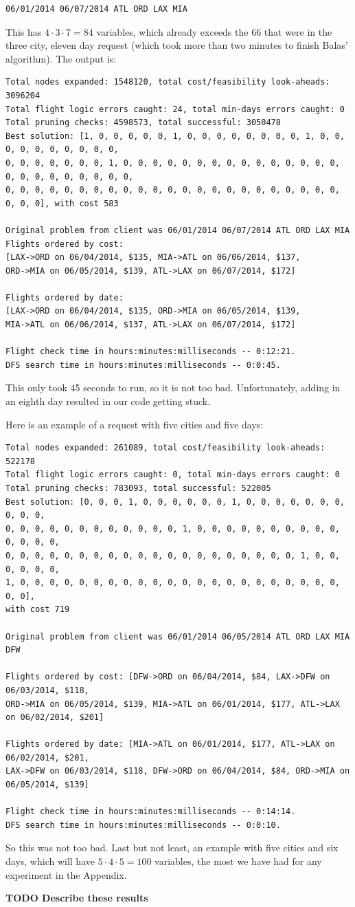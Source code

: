 \documentclass{article}
\begin{document}
\begin{verbatim}
06/01/2014 06/07/2014 ATL ORD LAX MIA
\end{verbatim}

This has $4 \cdot 3 \cdot 7 = 84$ variables, which already exceeds the 66 that were in the three city, eleven day request (which took more than two
minutes to finish Balas' algorithm). The output is:

\scriptsize
\begin{verbatim}
Total nodes expanded: 1548120, total cost/feasibility look-aheads: 3096204
Total flight logic errors caught: 24, total min-days errors caught: 0
Total pruning checks: 4598573, total successful: 3050478
Best solution: [1, 0, 0, 0, 0, 0, 1, 0, 0, 0, 0, 0, 0, 0, 0, 1, 0, 0, 0, 0, 0, 0, 0, 0, 0, 0,
0, 0, 0, 0, 0, 0, 0, 1, 0, 0, 0, 0, 0, 0, 0, 0, 0, 0, 0, 0, 0, 0, 0, 0, 0, 0, 0, 0, 0, 0, 0, 0,
0, 0, 0, 0, 0, 0, 0, 0, 0, 0, 0, 0, 0, 0, 0, 0, 0, 0, 0, 0, 0, 0, 0, 0, 0, 0], with cost 583

Original problem from client was 06/01/2014 06/07/2014 ATL ORD LAX MIA
Flights ordered by cost:
[LAX->ORD on 06/04/2014, $135, MIA->ATL on 06/06/2014, $137,
ORD->MIA on 06/05/2014, $139, ATL->LAX on 06/07/2014, $172]

Flights ordered by date:
[LAX->ORD on 06/04/2014, $135, ORD->MIA on 06/05/2014, $139,
MIA->ATL on 06/06/2014, $137, ATL->LAX on 06/07/2014, $172]

Flight check time in hours:minutes:milliseconds -- 0:12:21.
DFS search time in hours:minutes:milliseconds -- 0:0:45.
\end{verbatim}
\normalsize

This only took 45 seconds to run, so it is not too bad. Unfortunately, adding in an eighth day resulted in our code getting stuck.

Here is an example of a request with five cities and five days:


\scriptsize
\begin{verbatim}
Total nodes expanded: 261089, total cost/feasibility look-aheads: 522178
Total flight logic errors caught: 0, total min-days errors caught: 0
Total pruning checks: 783093, total successful: 522005
Best solution: [0, 0, 0, 1, 0, 0, 0, 0, 0, 0, 1, 0, 0, 0, 0, 0, 0, 0, 0, 0, 0,
0, 0, 0, 0, 0, 0, 0, 0, 0, 0, 0, 0, 1, 0, 0, 0, 0, 0, 0, 0, 0, 0, 0, 0, 0, 0, 0,
0, 0, 0, 0, 0, 0, 0, 0, 0, 0, 0, 0, 0, 0, 0, 0, 0, 0, 0, 0, 1, 0, 0, 0, 0, 0, 0,
1, 0, 0, 0, 0, 0, 0, 0, 0, 0, 0, 0, 0, 0, 0, 0, 0, 0, 0, 0, 0, 0, 0, 0, 0],
with cost 719

Original problem from client was 06/01/2014 06/05/2014 ATL ORD LAX MIA DFW

Flights ordered by cost: [DFW->ORD on 06/04/2014, $84, LAX->DFW on 06/03/2014, $118,
ORD->MIA on 06/05/2014, $139, MIA->ATL on 06/01/2014, $177, ATL->LAX on 06/02/2014, $201]

Flights ordered by date: [MIA->ATL on 06/01/2014, $177, ATL->LAX on 06/02/2014, $201,
LAX->DFW on 06/03/2014, $118, DFW->ORD on 06/04/2014, $84, ORD->MIA on 06/05/2014, $139]

Flight check time in hours:minutes:milliseconds -- 0:14:14.
DFS search time in hours:minutes:milliseconds -- 0:0:10.
\end{verbatim}
\normalsize

So this was not too bad. Last but not least, an example with five cities and six days, which will have $5\cdot 4\cdot 5 = 100$ variables, the most we
have had for any experiment in the Appendix.

{\bf TODO Describe these results}
\end{document}
